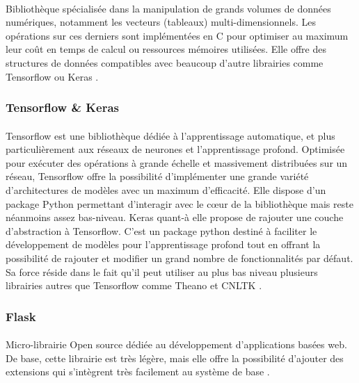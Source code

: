 		\paragraph{}
		Bibliothèque spécialisée dans la manipulation de grands volumes de données numériques, notamment les vecteurs (tableaux) multi-dimensionnels. Les opérations sur ces derniers sont implémentées en C pour optimiser au maximum leur coût en temps de calcul ou ressources mémoires utilisées. Elle offre des structures de données compatibles avec beaucoup d'autre librairies comme Tensorflow ou Keras \cite{numpy}.
		
		\subsubsection*{Tensorflow \& Keras}\label{tf&keras}
		\paragraph{}
		Tensorflow est une bibliothèque dédiée à l'apprentissage automatique, et plus particulièrement aux réseaux de neurones et l'apprentissage profond. Optimisée pour exécuter des opérations à grande échelle et massivement distribuées sur un réseau, Tensorflow offre la possibilité d'implémenter une grande variété d'architectures de modèles avec un maximum d'efficacité. Elle dispose d'un package Python permettant d'interagir avec le c\oe{}ur de la bibliothèque mais reste néanmoins assez bas-niveau. Keras quant-à elle propose de rajouter une couche d'abstraction à Tensorflow. C'est un package python destiné à faciliter le développement de modèles pour l'apprentissage profond tout en offrant la possibilité de rajouter et modifier un grand nombre de fonctionnalités par défaut. Sa force réside dans le fait qu'il peut utiliser au plus bas niveau plusieurs librairies autres que Tensorflow comme Theano et CNLTK \cite{tf,keras,theano,cnltk}.
		
		\subsubsection*{Flask}
		\paragraph{}
		Micro-librairie Open source dédiée au développement d'applications basées web. De base, cette librairie est très légère, mais elle offre la possibilité d'ajouter des extensions qui s'intègrent très facilement au système de base \cite{flask}.
		
